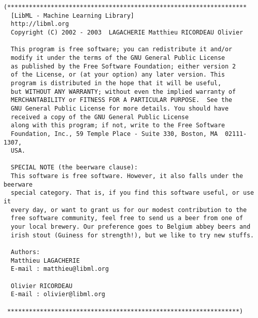 \begin{verbatim}
(******************************************************************
  [LibML - Machine Learning Library]
  http://libml.org
  Copyright (C) 2002 - 2003  LAGACHERIE Matthieu RICORDEAU Olivier
  
  This program is free software; you can redistribute it and/or
  modify it under the terms of the GNU General Public License
  as published by the Free Software Foundation; either version 2
  of the License, or (at your option) any later version. This
  program is distributed in the hope that it will be useful,
  but WITHOUT ANY WARRANTY; without even the implied warranty of
  MERCHANTABILITY or FITNESS FOR A PARTICULAR PURPOSE.  See the
  GNU General Public License for more details. You should have
  received a copy of the GNU General Public License
  along with this program; if not, write to the Free Software
  Foundation, Inc., 59 Temple Place - Suite 330, Boston, MA  02111-1307,
  USA.
  
  SPECIAL NOTE (the beerware clause):
  This software is free software. However, it also falls under the beerware
  special category. That is, if you find this software useful, or use it
  every day, or want to grant us for our modest contribution to the
  free software community, feel free to send us a beer from one of
  your local brewery. Our preference goes to Belgium abbey beers and
  irish stout (Guiness for strength!), but we like to try new stuffs.

  Authors:
  Matthieu LAGACHERIE
  E-mail : matthieu@libml.org
  
  Olivier RICORDEAU
  E-mail : olivier@libml.org

 ****************************************************************)
\end{verbatim}